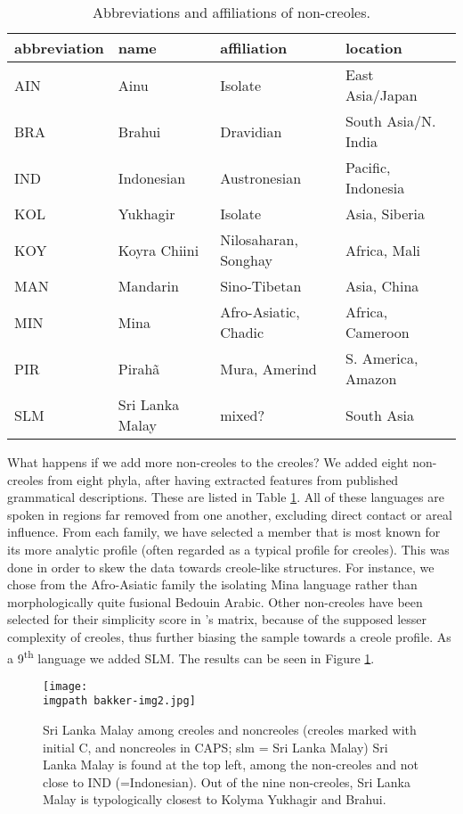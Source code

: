 \begin{table}%
\begin{tabular}{llll}
 abbreviation & name & affiliation & location\\
\hline
AIN & Ainu & Isolate & East Asia/Japan\\
BRA & Brahui & Dravidian & South Asia/N. India\\
IND & Indonesian & Austronesian & Pacific, Indonesia\\
KOL & Yukhagir & Isolate & Asia, Siberia\\
KOY & Koyra Chiini & Nilosaharan, Songhay & Africa, Mali\\
MAN & Mandarin & Sino-Tibetan & Asia, China\\
MIN & Mina & Afro-Asiatic, Chadic & Africa, Cameroon\\
PIR & Pirah\~a & Mura, Amerind & S. America, Amazon\\
SLM & Sri Lanka Malay & mixed? & South Asia\\
\end{tabular}
 \caption{Abbreviations and affiliations of non-creoles.}
\label{bakker:tab:2}
\end{table}

What happens if we add more non-creoles to the creoles? We added eight non-creoles from eight phyla, after having extracted features from published grammatical descriptions. These are listed in Table \ref{bakker:tab:2}. All of these languages are spoken in regions far removed from one another, excluding direct contact or areal influence. From each family, we have selected a member that is most known for its more analytic profile (often regarded as a typical profile for creoles). This was done in order to skew the data towards creole-like structures. For instance, we chose from the Afro-Asiatic family the isolating Mina language rather than morphologically quite fusional Bedouin Arabic. Other non-creoles have been selected for their simplicity score in \citet{Parkvall2008}'s matrix, because of the supposed lesser complexity of creoles, thus further biasing the sample towards a creole profile. As a 9\textsuperscript{th} language we added SLM. The results can be seen in Figure \ref{fig:bakker4}.

\begin{figure}%
\texttt{[image: \\imgpath bakker-img2.jpg]}
\caption{Sri Lanka Malay among creoles and noncreoles (creoles marked with initial C, and noncreoles in CAPS; slm = Sri Lanka Malay)
Sri Lanka Malay is found at the top left, among the non-creoles and not close to IND (=Indonesian). Out of the nine non-creoles, Sri Lanka Malay is typologically closest to Kolyma Yukhagir and Brahui.}
\label{fig:bakker4} 
\end{figure}

